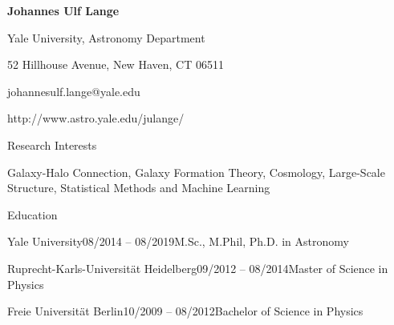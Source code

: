 \documentclass[11pt]{resume} %
\begin{document}
\centerline{\color{blue} \LARGE \bf Johannes Ulf Lange}
\centerline{Yale University, Astronomy Department}
\centerline{52 Hillhouse Avenue, New Haven, CT 06511}
\centerline{johannesulf.lange@yale.edu}
\centerline{http://www.astro.yale.edu/julange/}
\medskip

\begin{rSection}{Research Interests}
  \begin{adjustwidth}{0.5cm}{}
    Galaxy-Halo Connection, Galaxy Formation Theory, Cosmology, Large-Scale Structure, Statistical Methods and Machine Learning
  \end{adjustwidth}
\end{rSection}


\begin{rSection}{Education}
  \begin{adjustwidth}{0.5cm}{}
    \begin{rSubsection}{Yale University}{08/2014 -- 08/2019}{M.Sc., M.Phil, Ph.D. in Astronomy}{}\end{rSubsection}

    \begin{rSubsection}{Ruprecht-Karls-Universität Heidelberg}{09/2012 -- 08/2014}{Master of Science in Physics}{}\end{rSubsection}

    \begin{rSubsection}{Freie Universität Berlin}{10/2009 -- 08/2012}{Bachelor of Science in Physics}{}\end{rSubsection}
  \end{adjustwidth}
\end{rSection}
\end{document}
